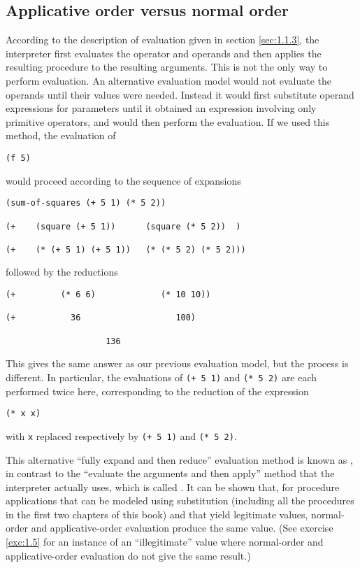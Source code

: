 \subsection*{Applicative order versus normal order}

According to the description of evaluation given in section
\ref{sec:1.1.3}, the interpreter first evaluates the operator and operands
and then applies the resulting procedure to the resulting arguments.
This is not the only way to perform evaluation.  An alternative
evaluation model would not evaluate the operands until their values
were needed.  Instead it would first substitute operand expressions
for parameters until it obtained an expression involving only
primitive operators, and would then perform the evaluation.  If we
used this method, the evaluation of

\begin{verbatim}
(f 5)
\end{verbatim}

\noindent would proceed according to the sequence of expansions

\begin{verbatim}
(sum-of-squares (+ 5 1) (* 5 2))

(+    (square (+ 5 1))      (square (* 5 2))  )

(+    (* (+ 5 1) (+ 5 1))   (* (* 5 2) (* 5 2)))
\end{verbatim}

\noindent followed by the reductions

\begin{verbatim}
(+         (* 6 6)             (* 10 10))

(+           36                   100)

                    136
\end{verbatim}

This gives the same answer as our previous evaluation model, but the
process is different.  In particular, the evaluations
of \texttt{(+ 5 1)} and \texttt{(* 5 2)} are each performed twice here,
corresponding to the reduction of the expression

\begin{verbatim}
(* x x)
\end{verbatim}

\noindent with \texttt{x} replaced respectively by \texttt{(+ 5 1)} and \texttt{(* 5 2)}.

This alternative ``fully expand and then reduce'' evaluation method is
known as , in contrast to the ``evaluate
the arguments and then apply'' method that the interpreter actually
uses, which is called .  It can be
shown that, for procedure applications that can be modeled using
substitution (including all the procedures in the first two chapters
of this book) and that yield legitimate values, normal-order and
applicative-order evaluation produce the same value.  (See exercise
\ref{exc:1.5} for an instance of an ``illegitimate'' value where
normal-order and applicative-order evaluation do not give the same
result.)

